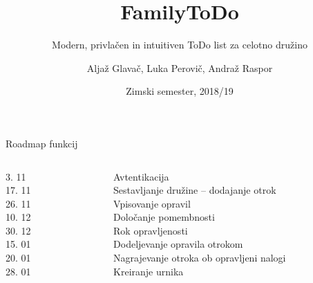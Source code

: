 \documentclass[10pt]{beamer}
\title{FamilyToDo}
\subtitle{Modern, privlačen in intuitiven ToDo list za celotno družino}
\date{Zimski semester, 2018/19}
\author{Aljaž Glavač, Luka Perovič, Andraž Raspor}
\institute{Univerza v Ljubljani, Fakulteta za računalništvo in informatiko}
\begin{document}
\maketitle


\begin{frame}{Roadmap funkcij}
\begin{columns}[c]
    \begin{column}{0.1\textwidth}
        \hfill 3. 11 \\
        \hfill 17. 11 \\
        \hfill 26. 11 \\
        \hfill 10. 12 \\
        \hfill 30. 12 \\
        \hfill 15. 01 \\
				\hfill 20. 01 \\
        \hfill 28. 01 \\
    \end{column}
    \hspace{-15pt}\vrule\hspace{5pt}%
    \begin{column}{0.9\textwidth}  %
            Avtentikacija \\
            Sestavljanje družine -- dodajanje otrok \\
            Vpisovanje opravil \\
            Določanje pomembnosti \\
            Rok opravljenosti \\
            Dodeljevanje opravila otrokom \\
						Nagrajevanje otroka ob opravljeni nalogi \\
            Kreiranje urnika \\
    \end{column}
\end{columns}
\end{frame}

\end{document}
